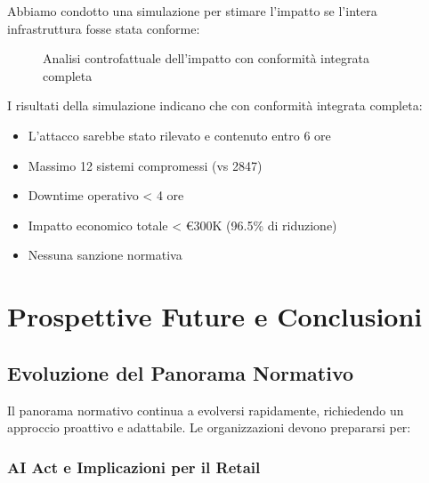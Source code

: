 Abbiamo condotto una simulazione per stimare l'impatto se l'intera infrastruttura fosse stata conforme:

\begin{figure}[h]
\centering
{}
\caption{Analisi controfattuale dell'impatto con conformità integrata completa}
\label{fig:controfattuale}
\end{figure}

I risultati della simulazione indicano che con conformità integrata completa:
\begin{itemize}
    \item L'attacco sarebbe stato rilevato e contenuto entro 6 ore
    \item Massimo 12 sistemi compromessi (vs 2847)
    \item Downtime operativo < 4 ore
    \item Impatto economico totale < €300K (96.5\% di riduzione)
    \item Nessuna sanzione normativa
\end{itemize}

\section{Prospettive Future e Conclusioni}
\label{sec:4.9_conclusioni}

\subsection{Evoluzione del Panorama Normativo}
\label{subsec:4.9.1_evoluzione}

Il panorama normativo continua a evolversi rapidamente, richiedendo un approccio proattivo e adattabile. Le organizzazioni devono prepararsi per:

\subsubsection{AI Act e Implicazioni per il Retail}

